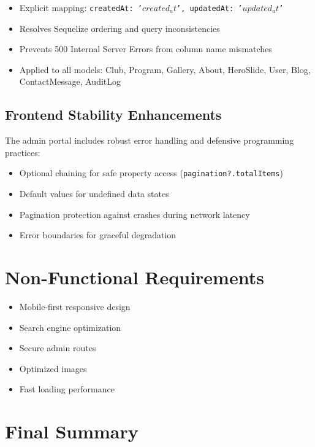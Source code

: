 \documentclass[12pt,a4paper]{article}
\begin{document}
\begin{itemize}
    \item Explicit mapping: \texttt{createdAt: '$created_at$', updatedAt: '$updated_at$'}
    \item Resolves Sequelize ordering and query inconsistencies
    \item Prevents 500 Internal Server Errors from column name mismatches
    \item Applied to all models: Club, Program, Gallery, About, HeroSlide, User, Blog, ContactMessage, AuditLog
\end{itemize}

\subsection{Frontend Stability Enhancements}
The admin portal includes robust error handling and defensive programming practices:

\begin{itemize}
    \item Optional chaining for safe property access (\texttt{pagination?.totalItems})
    \item Default values for undefined data states
    \item Pagination protection against crashes during network latency
    \item Error boundaries for graceful degradation
\end{itemize}

\section{Non-Functional Requirements}

\begin{itemize}
    \item Mobile-first responsive design
    \item Search engine optimization
    \item Secure admin routes
    \item Optimized images
    \item Fast loading performance
\end{itemize}

\section{Final Summary}
\end{document}
